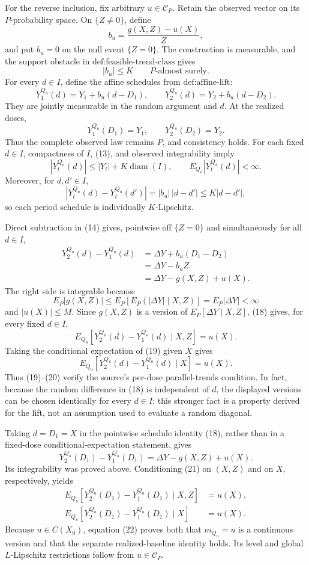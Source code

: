 For the reverse inclusion, fix arbitrary \(u\in\mathcal C_P\). Retain the observed vector on its \(P\)-probability space. On \(\{Z\neq0\}\), define
\[
b_u=\frac{g(X,Z)-u(X)}{Z},
\]
and put \(b_u=0\) on the null event \(\{Z=0\}\). The construction is measurable, and the support obstacle in \(\text{def:feasible-trend-class}\) gives
\[
|b_u|\leq K
\qquad P\text{-almost surely}. \tag{13}
\]
For every \(d\in I\), define the affine schedules from \(\text{def:affine-lift}\):
\[
Y_1^{Q_u}(d)=Y_1+b_u(d-D_1),
\qquad
Y_2^{Q_u}(d)=Y_2+b_u(d-D_2). \tag{14}
\]
They are jointly measurable in the random argument and \(d\). At the realized doses,
\[
Y_1^{Q_u}(D_1)=Y_1,
\qquad
Y_2^{Q_u}(D_2)=Y_2. \tag{15}
\]
Thus the complete observed law remains \(P\), and consistency holds. For each fixed \(d\in I\), compactness of \(I\), (13), and observed integrability imply
\[
|Y_t^{Q_u}(d)|\leq |Y_t|+K\operatorname{diam}(I),
\qquad
E_{Q_u}|Y_t^{Q_u}(d)|<\infty. \tag{16}
\]
Moreover, for \(d,d'\in I\),
\[
|Y_t^{Q_u}(d)-Y_t^{Q_u}(d')|
=|b_u|\,|d-d'|
\leq K|d-d'|, \tag{17}
\]
so each period schedule is individually \(K\)-Lipschitz.

Direct subtraction in (14) gives, pointwise off \(\{Z=0\}\) and simultaneously for all \(d\in I\),
\[
\begin{aligned}
Y_2^{Q_u}(d)-Y_1^{Q_u}(d)
&=\Delta Y+b_u(D_1-D_2)\\
&=\Delta Y-b_uZ\\
&=\Delta Y-g(X,Z)+u(X).
\end{aligned} \tag{18}
\]
The right side is integrable because
\[
E_P|g(X,Z)|
\leq E_P\!\left[E_P(|\Delta Y|\mid X,Z)\right]
=E_P|\Delta Y|<\infty
\]
and \(|u(X)|\leq M\). Since \(g(X,Z)\) is a version of \(E_P[\Delta Y\mid X,Z]\), (18) gives, for every fixed \(d\in I\),
\[
E_{Q_u}[Y_2^{Q_u}(d)-Y_1^{Q_u}(d)\mid X,Z]=u(X). \tag{19}
\]
Taking the conditional expectation of (19) given \(X\) gives
\[
E_{Q_u}[Y_2^{Q_u}(d)-Y_1^{Q_u}(d)\mid X]=u(X). \tag{20}
\]
Thus (19)--(20) verify the source's per-dose parallel-trends condition. In fact, because the random difference in (18) is independent of \(d\), the displayed versions can be chosen identically for every \(d\in I\); this stronger fact is a property derived for the lift, not an assumption used to evaluate a random diagonal.

Taking \(d=D_1=X\) in the pointwise schedule identity (18), rather than in a fixed-dose conditional-expectation statement, gives
\[
Y_2^{Q_u}(D_1)-Y_1^{Q_u}(D_1)
=\Delta Y-g(X,Z)+u(X). \tag{21}
\]
Its integrability was proved above. Conditioning (21) on \((X,Z)\) and on \(X\), respectively, yields
\[
\begin{aligned}
E_{Q_u}[Y_2^{Q_u}(D_1)-Y_1^{Q_u}(D_1)\mid X,Z]&=u(X),\\
E_{Q_u}[Y_2^{Q_u}(D_1)-Y_1^{Q_u}(D_1)\mid X]&=u(X).
\end{aligned} \tag{22}
\]
Because \(u\in C(X_0)\), equation (22) proves both that \(m_{Q_u}=u\) is a continuous version and that the separate realized-baseline identity holds. Its level and global \(L\)-Lipschitz restrictions follow from \(u\in\mathcal C_P\).

